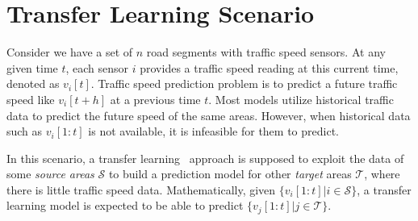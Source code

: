 \section{Transfer Learning Scenario}
Consider we have a set of $n$ road segments with traffic speed sensors. 
At any given time $t$, 
each sensor $i$ provides a traffic speed reading at this current time, denoted as $v_i[t]$.
Traffic speed prediction problem is to predict a future traffic speed like $v_i[t+h]$ at a previous time $t$. 
Most models utilize historical traffic data to predict the future speed of the same areas. 
However, when historical data such as $v_i[1:t]$ is not available, it is infeasible for them to predict. 

In this scenario, a transfer learning~\cite{Pan:Survey} approach is supposed to exploit the data of some \textit{source areas} $\mathcal{S}$ to build a prediction model for other \textit{target} areas $\mathcal{T}$, where there is little traffic speed data.
Mathematically, given $\{v_i[1:t]|i\in \mathcal{S}\}$, a transfer learning model is expected to be able to predict $\{v_j[1:t]|j\in \mathcal{T}\}$.




